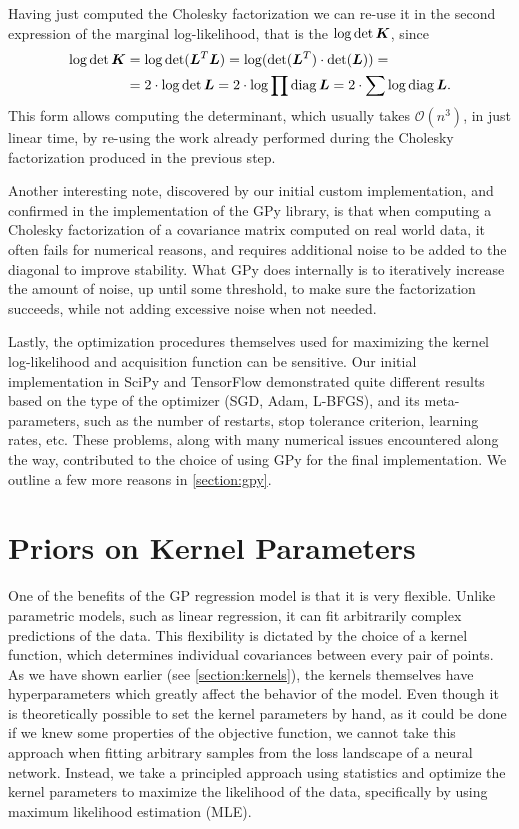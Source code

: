 Having just computed the Cholesky factorization we can re-use it in the second
expression of the marginal log-likelihood, that is the $\log \det {\bm{K}}$, since
\begin{align}
\log \det {\bm{K}} &= \log \det({\bm{L}}^T {\bm{L}}) = \log(\det({\bm{L}}^T) \cdot \det({\bm{L}})) = \\
&= 2 \cdot \log \det {\bm{L}} = 2 \cdot \log \prod \operatorname{diag} {\bm{L}} = 2 \cdot \sum \log \operatorname{diag} {\bm{L}}.
\end{align}
This form allows computing the determinant, which usually takes $\mathcal{O}(n^3)$, in
just linear time, by re-using the work already performed during the Cholesky
factorization produced in the previous step.

Another interesting note, discovered by our initial custom implementation, and
confirmed in the implementation of the GPy \citep{gpy2014} library, is that
when computing a Cholesky factorization of a covariance matrix computed on real
world data, it often fails for numerical reasons, and requires additional noise
to be added to the diagonal to improve stability. What GPy does internally is
to iteratively increase the amount of noise, up until some threshold, to make
sure the factorization succeeds, while not adding excessive noise when not
needed.

Lastly, the optimization procedures themselves used for maximizing the kernel
log-likelihood and acquisition function can be sensitive. Our initial
implementation in SciPy and TensorFlow demonstrated quite different results
based on the type of the optimizer (SGD, Adam, L-BFGS), and its
meta-parameters, such as the number of restarts, stop tolerance criterion,
learning rates, etc. These problems, along with many numerical issues
encountered along the way, contributed to the choice of using GPy for the final
implementation. We outline a few more reasons in \autoref{section:gpy}.


\section{Priors on Kernel Parameters}
\label{section:priors-on-kernel-params}

One of the benefits of the GP regression model is that it is very flexible.
Unlike parametric models, such as linear regression, it can fit arbitrarily
complex predictions of the data. This flexibility is dictated by the choice of
a kernel function, which determines individual covariances between every pair
of points. As we have shown earlier (see \autoref{section:kernels}), the
kernels themselves have hyperparameters which greatly affect the behavior of
the model. Even though it is theoretically possible to set the kernel
parameters by hand, as it could be done if we knew some properties of the
objective function, we cannot take this approach when fitting arbitrary samples
from the loss landscape of a neural network. Instead, we take a principled
approach using statistics and optimize the kernel parameters to maximize the
likelihood of the data, specifically by using maximum likelihood estimation
(MLE).

